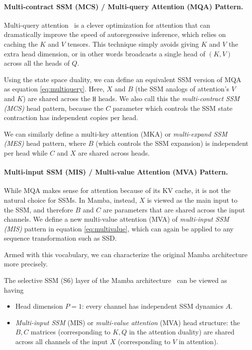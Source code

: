 \paragraph{Multi-contract SSM (MCS) / Multi-query Attention (MQA) Pattern.}

Multi-query attention~\citep{shazeer2019fast} is a clever optimization for attention that can dramatically improve the speed of autoregressive inference, which relies on caching the $K$ and $V$ tensors. This technique simply avoids giving $K$ and $V$ the extra head dimension, or in other words broadcasts a single head of $(K, V)$ across all the heads of $Q$.

Using the state space duality, we can define an equivalent SSM version of MQA as equation \eqref{eq:multiquery}.
Here, $X$ and $B$ (the SSM analogs of attention's $V$ and $K$) are shared across the $\mathtt{H}$ heads. We also call this the \emph{multi-contract SSM (MCS)} head pattern, because the $C$ parameter which controls the SSM state contraction has independent copies per head.

We can similarly define a multi-key attention (MKA) or \emph{multi-expand SSM (MES)} head pattern, where $B$ (which controls the SSM expansion) is independent per head while $C$ and $X$ are shared across heads.

\paragraph{Multi-input SSM (MIS) / Multi-value Attention (MVA) Pattern.}

While MQA makes sense for attention because of its KV cache, it is not the natural choice for SSMs. In Mamba, instead, $X$ is viewed as the main input to the SSM, and therefore $B$ and $C$ are parameters that are shared across the input channels. We define a new multi-value attention (MVA) of \emph{multi-input SSM (MIS)} pattern in equation \eqref{eq:multivalue}, which can again be applied to any sequence transformation such as SSD.

Armed with this vocabulary, we can characterize the original Mamba architecture more precisely.

\begin{proposition}
  \label{prop:mamba-multihead}
  The selective SSM (S6) layer of the Mamba architecture~\citep{gu2023mamba} can be viewed as having
  \begin{itemize}
    \item Head dimension $P=1$: every channel has independent SSM dynamics $A$.
    \item \emph{Multi-input SSM} (MIS) or \emph{multi-value attention} (MVA) head structure: the $B, C$ matrices (corresponding to $K, Q$ in the attention duality) are shared across all channels of the input $X$ (corresponding to $V$ in attention).
  \end{itemize}
\end{proposition}

